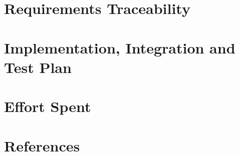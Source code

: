 \documentclass{ConfigurationFiles/Politecnico_Di_Milano}
\begin{document}
    \chapter{Requirements Traceability}
    \label{ch:requirements_traceability}%
    

    \chapter{Implementation, Integration and Test Plan}
    \label{ch:implementation_integration_test_plan}%
    


    \chapter{Effort Spent}
    \label{ch:effort_spent}%
    


    \chapter{References}
    \label{ch:references}%
    

    \listoffigures

    \listoftables
    \cleardoublepage
\end{document}
